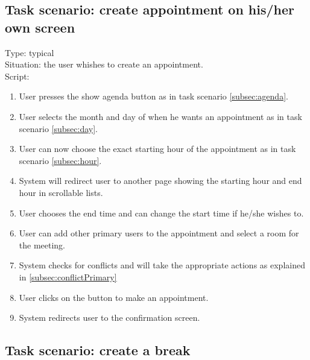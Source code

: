 \documentclass[11pt, a4paper,svglistings]{report}
\begin{document}
\subsection{Task scenario: create appointment on his/her own screen}


Type: typical \\
Situation: the user whishes to create an appointment. \\
Script:
\begin{enumerate}
\item User presses the show agenda button as in task scenario \ref{subsec:agenda}.
\item User selects the month and day of when he wants an appointment as in task scenario \ref{subsec:day}.
\item User can now choose the exact starting hour of the appointment as in task scenario \ref{subsec:hour}.
\item System will redirect user to another page showing the starting hour and end hour in scrollable lists.
\item User chooses the end time and can change the start time if he/she wishes to.
\item User can add other primary users to the appointment and select a room for the meeting.
\item System checks for conflicts and will take the appropriate actions as explained in \ref{subsec:conflictPrimary}
\item User clicks on the button to make an appointment.
\item System redirects user to the confirmation screen.
\end{enumerate}


\subsection{Task scenario: create a break}
\end{document}
